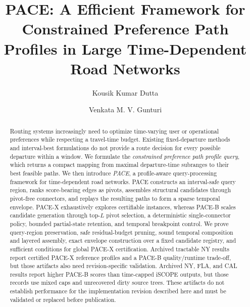 \documentclass[a4paper,fleqn]{cas-dc}
\begin{document}
\let\WriteBookmarks\relax


\title[mode=title]{PACE: A Efficient Framework for Constrained Preference Path Profiles in Large Time-Dependent Road Networks}

\author[1]{Kousik Kumar Dutta}
\cormark[1]

\author[2]{Venkata M. V. Gunturi}




\begin{abstract}
Routing systems increasingly need to optimize time-varying user or operational preferences while respecting a travel-time budget. Existing fixed-departure methods and interval-best formulations do not provide a route decision for every possible departure within a window. We formulate the \emph{constrained preference path profile query}, which returns a compact mapping from maximal departure-time subranges to their best feasible paths. We then introduce \emph{PACE}, a profile-aware query-processing framework for time-dependent road networks. PACE constructs an interval-safe query region, ranks score-bearing edges as pivots, assembles structural candidates through pivot-free connectors, and replays the resulting paths to form a sparse temporal envelope. PACE-X exhaustively explores certifiable instances, whereas PACE-B scales candidate generation through top-\(L\) pivot selection, a deterministic single-connector policy, bounded partial-state retention, and temporal breakpoint control. We prove query-region preservation, safe residual-budget pruning, sound temporal composition and layered assembly, exact envelope construction over a fixed candidate registry, and sufficient conditions for global PACE-X certification. Archived tractable NY results report certified PACE-X reference profiles and a PACE-B quality/runtime trade-off, but those artifacts also need revision-specific validation. Archived NY, FLA, and CAL results report higher PACE-B scores than time-capped iSCOPE outputs, but those records use mixed caps and unrecovered dirty source trees. These artifacts do not establish performance for the implementation revision described here and must be validated or replaced before publication.
\end{abstract}
\end{document}
